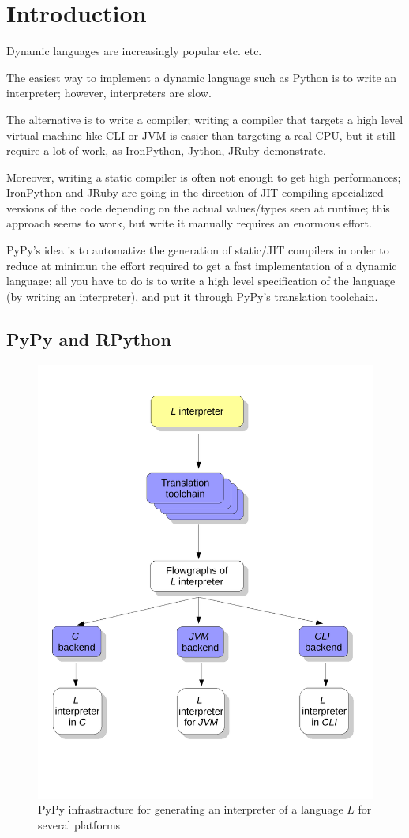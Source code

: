 \section{Introduction}

Dynamic languages are increasingly popular etc. etc.

The easiest way to implement a dynamic language such as Python is to write an
interpreter; however, interpreters are slow.

The alternative is to write a compiler; writing a compiler that targets a high
level virtual machine like CLI or JVM is easier than targeting a real CPU, but
it still require a lot of work, as IronPython, Jython, JRuby demonstrate.

Moreover, writing a static compiler is often not enough to get high
performances; IronPython and JRuby are going in the direction of JIT compiling
specialized versions of the code depending on the actual values/types seen at
runtime; this approach seems to work, but write it manually requires an
enormous effort.

PyPy's idea is to automatize the generation of static/JIT compilers in order
to reduce at minimun the effort required to get a fast implementation of a
dynamic language; all you have to do is to write a high level specification of
the language (by writing an interpreter), and put it through PyPy's
translation toolchain.

\subsection{PyPy and RPython}

\begin{figure}[h]
\begin{center}
\includegraphics[width=.6\textwidth]{diagram0}
\caption{PyPy infrastracture for generating an interpreter of a
  language $L$ for several platforms}\label{pypy-fig}
\end{center}
\end{figure}

